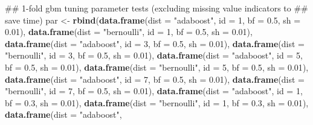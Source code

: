 \documentclass[11pt,]{article}
\newenvironment{Shaded}{\begin{snugshade}}{\end{snugshade}}
\newcommand{\KeywordTok}[1]{\textcolor[rgb]{0.13,0.29,0.53}{\textbf{{#1}}}}
\newcommand{\DataTypeTok}[1]{\textcolor[rgb]{0.13,0.29,0.53}{{#1}}}
\newcommand{\DecValTok}[1]{\textcolor[rgb]{0.00,0.00,0.81}{{#1}}}
\newcommand{\FloatTok}[1]{\textcolor[rgb]{0.00,0.00,0.81}{{#1}}}
\newcommand{\StringTok}[1]{\textcolor[rgb]{0.31,0.60,0.02}{{#1}}}
\newcommand{\NormalTok}[1]{{#1}}
\begin{document}
\begin{Shaded}
\begin{Highlighting}[]
{\NormalTok{## 1-fold gbm tuning parameter tests (excluding missing value indicators to}
\NormalTok{## save time)}
\NormalTok{par <-}\StringTok{ }\KeywordTok{rbind}\NormalTok{(}\KeywordTok{data.frame}\NormalTok{(}\DataTypeTok{dist =} \StringTok{"adaboost"}\NormalTok{, }\DataTypeTok{id =} \DecValTok{1}\NormalTok{, }\DataTypeTok{bf =} \FloatTok{0.5}\NormalTok{, }\DataTypeTok{sh =} \FloatTok{0.01}\NormalTok{), }\KeywordTok{data.frame}\NormalTok{(}\DataTypeTok{dist =} \StringTok{"bernoulli"}\NormalTok{, }
    \DataTypeTok{id =} \DecValTok{1}\NormalTok{, }\DataTypeTok{bf =} \FloatTok{0.5}\NormalTok{, }\DataTypeTok{sh =} \FloatTok{0.01}\NormalTok{), }\KeywordTok{data.frame}\NormalTok{(}\DataTypeTok{dist =} \StringTok{"adaboost"}\NormalTok{, }\DataTypeTok{id =} \DecValTok{3}\NormalTok{, }\DataTypeTok{bf =} \FloatTok{0.5}\NormalTok{, }
    \DataTypeTok{sh =} \FloatTok{0.01}\NormalTok{), }\KeywordTok{data.frame}\NormalTok{(}\DataTypeTok{dist =} \StringTok{"bernoulli"}\NormalTok{, }\DataTypeTok{id =} \DecValTok{3}\NormalTok{, }\DataTypeTok{bf =} \FloatTok{0.5}\NormalTok{, }\DataTypeTok{sh =} \FloatTok{0.01}\NormalTok{), }
    \KeywordTok{data.frame}\NormalTok{(}\DataTypeTok{dist =} \StringTok{"adaboost"}\NormalTok{, }\DataTypeTok{id =} \DecValTok{5}\NormalTok{, }\DataTypeTok{bf =} \FloatTok{0.5}\NormalTok{, }\DataTypeTok{sh =} \FloatTok{0.01}\NormalTok{), }\KeywordTok{data.frame}\NormalTok{(}\DataTypeTok{dist =} \StringTok{"bernoulli"}\NormalTok{, }
        \DataTypeTok{id =} \DecValTok{5}\NormalTok{, }\DataTypeTok{bf =} \FloatTok{0.5}\NormalTok{, }\DataTypeTok{sh =} \FloatTok{0.01}\NormalTok{), }\KeywordTok{data.frame}\NormalTok{(}\DataTypeTok{dist =} \StringTok{"adaboost"}\NormalTok{, }\DataTypeTok{id =} \DecValTok{7}\NormalTok{, }
        \DataTypeTok{bf =} \FloatTok{0.5}\NormalTok{, }\DataTypeTok{sh =} \FloatTok{0.01}\NormalTok{), }\KeywordTok{data.frame}\NormalTok{(}\DataTypeTok{dist =} \StringTok{"bernoulli"}\NormalTok{, }\DataTypeTok{id =} \DecValTok{7}\NormalTok{, }\DataTypeTok{bf =} \FloatTok{0.5}\NormalTok{, }
        \DataTypeTok{sh =} \FloatTok{0.01}\NormalTok{), }\KeywordTok{data.frame}\NormalTok{(}\DataTypeTok{dist =} \StringTok{"adaboost"}\NormalTok{, }\DataTypeTok{id =} \DecValTok{1}\NormalTok{, }\DataTypeTok{bf =} \FloatTok{0.3}\NormalTok{, }\DataTypeTok{sh =} \FloatTok{0.01}\NormalTok{), }
    \KeywordTok{data.frame}\NormalTok{(}\DataTypeTok{dist =} \StringTok{"bernoulli"}\NormalTok{, }\DataTypeTok{id =} \DecValTok{1}\NormalTok{, }\DataTypeTok{bf =} \FloatTok{0.3}\NormalTok{, }\DataTypeTok{sh =} \FloatTok{0.01}\NormalTok{), }\KeywordTok{data.frame}\NormalTok{(}\DataTypeTok{dist =} \StringTok{"adaboost"}\NormalTok{, }
}
\end{Highlighting}
\end{Shaded}
\end{document}
